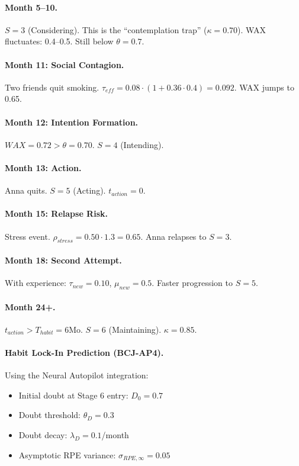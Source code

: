 \paragraph{Month 5--10.} $S=3$ (Considering). This is the ``contemplation trap'' ($\kappa=0.70$). WAX fluctuates: 0.4--0.5. Still below $\theta=0.7$.

\paragraph{Month 11: Social Contagion.} Two friends quit smoking. $\tau_{eff} = 0.08 \cdot (1 + 0.36 \cdot 0.4) = 0.092$. WAX jumps to 0.65.

\paragraph{Month 12: Intention Formation.} $WAX=0.72 > \theta=0.70$. $S=4$ (Intending).

\paragraph{Month 13: Action.} Anna quits. $S=5$ (Acting). $t_{action}=0$.

\paragraph{Month 15: Relapse Risk.} Stress event. $\rho_{stress}=0.50 \cdot 1.3 = 0.65$. Anna relapses to $S=3$.

\paragraph{Month 18: Second Attempt.} With experience: $\tau_{new}=0.10$, $\mu_{new}=0.5$. Faster progression to $S=5$.

\paragraph{Month 24+.} $t_{action} > T_{habit}=6$Mo. $S=6$ (Maintaining). $\kappa=0.85$.

\paragraph{Habit Lock-In Prediction (BCJ-AP4).} Using the Neural Autopilot integration:
\begin{itemize}[nosep]
\item Initial doubt at Stage 6 entry: $D_0 = 0.7$
\item Doubt threshold: $\theta_D = 0.3$
\item Doubt decay: $\lambda_D = 0.1$/month
\item Asymptotic RPE variance: $\sigma_{RPE,\infty} = 0.05$
\end{itemize}

